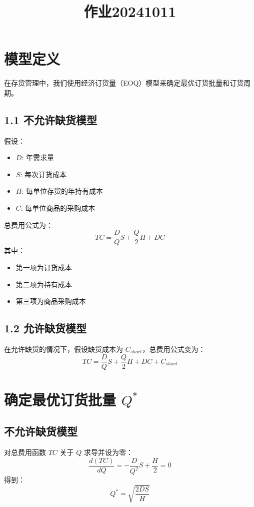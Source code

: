 \documentclass{article}
\begin{document}
\title{作业20241011}
\author{}
\date{}
\maketitle

\section{模型定义}

在存货管理中，我们使用经济订货量（EOQ）模型来确定最优订货批量和订货周期。

\subsection{1.1 不允许缺货模型}

假设：
\begin{itemize}
    \item \( D \): 年需求量
    \item \( S \): 每次订货成本
    \item \( H \): 每单位存货的年持有成本
    \item \( C \): 每单位商品的采购成本
\end{itemize}

总费用公式为：
\[
TC = \frac{D}{Q} S + \frac{Q}{2} H + DC
\]
其中：
\begin{itemize}
    \item 第一项为订货成本
    \item 第二项为持有成本
    \item 第三项为商品采购成本
\end{itemize}

\subsection{1.2 允许缺货模型}

在允许缺货的情况下，假设缺货成本为 \( C_{short} \)，总费用公式变为：
\[
TC = \frac{D}{Q} S + \frac{Q}{2} H + DC + C_{short}
\]

\section{确定最优订货批量 \( Q^* \)}

\subsection{不允许缺货模型}

对总费用函数 \( TC \) 关于 \( Q \) 求导并设为零：
\[
\frac{d(TC)}{dQ} = -\frac{D}{Q^2} S + \frac{H}{2} = 0
\]
得到：
\[
Q^* = \sqrt{\frac{2DS}{H}}
\]
\end{document}
